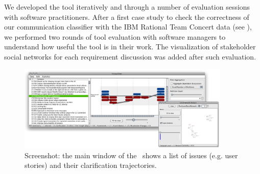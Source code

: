 We developed the tool iteratively and through a number of evaluation sessions with software practitioners. 
After a first case study to check the correctness of our communication classifier with the IBM Rational Team Concert data (see \cite{Knauss2012f}), we performed two rounds of tool evaluation with software managers to understand how useful the tool is in their work. 
The visualization of stakeholder social networks for each requirement discussion was added after such evaluation. 


\begin{figure}
\centering
\includegraphics[width=0.9\textwidth]{img/vissuelizer-screenshot}
\caption{Screenshot: the main window of the \viss\ shows a list of issues (e.g. user stories) and their clarification trajectories.}
\label{fig:screenshot}
\end{figure}